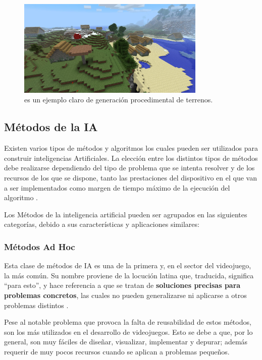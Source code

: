 \begin{figure}[h]
	\includegraphics[width=0.8\textwidth]{images/estadodelarte/ai/minecraft}
	\centering
	\caption{ es un ejemplo claro de generación procedimental de terrenos.}
	\label{minecraft}
\end{figure}

\subsection{Métodos de la IA}
Existen varios tipos de métodos y algoritmos los cuales pueden ser utilizados para construir inteligencias Artificiales. La elección entre los distintos tipos de métodos debe realizarse dependiendo del tipo de problema que se intenta resolver y de los recursos de los que se dispone, tanto las prestaciones del dispositivo en el que van a ser implementados como margen de tiempo máximo de la ejecución del algoritmo \cite{ai_and_games}. 

Los Métodos de la inteligencia artificial pueden ser agrupados en las siguientes categorías, debido a sus características y aplicaciones similares:

\subsubsection{Métodos Ad Hoc}
Esta clase de métodos de IA es una de la primera y, en el sector del videojuego, la más común. Su nombre proviene de la locución latina que, traducida, significa ``para esto'', y hace referencia a que se tratan de \textbf{soluciones precisas para problemas concretos}, las cuales no pueden generalizarse ni aplicarse a otros problemas distintos \cite{ai_and_games}.

Pese al notable problema que provoca la falta de reusabilidad de estos métodos, son los más utilizados en el desarrollo de videojuegos. Esto se debe a que, por lo general, son muy fáciles de diseñar, visualizar, implementar y depurar; además requerir de muy pocos recursos cuando se aplican a problemas pequeños.


